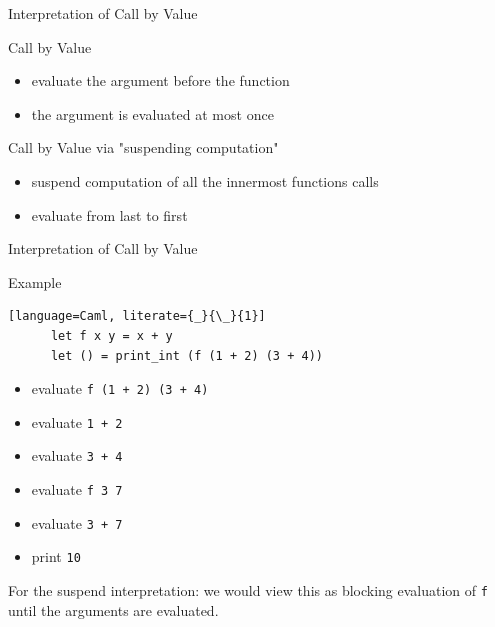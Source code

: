 \documentclass[10pt]{beamer}
\begin{document}
\begin{frame}[fragile]{Interpretation of Call by Value}
  \begin{alertblock}{Call by Value}
    \begin{itemize}
      \item evaluate the argument before the function
      \item the argument is evaluated at most once
    \end{itemize}
  \end{alertblock}

  \pause

  \begin{alertblock}{Call by Value via "suspending computation"}
    \begin{itemize}
      \item suspend computation of all the innermost functions calls
      \item evaluate from last to first
    \end{itemize}
  \end{alertblock}

\end{frame}

  \begin{frame}[fragile]{Interpretation of Call by Value}

  \begin{alertblock}{Example}
    \begin{lstlisting}[language=Caml, literate={_}{\_}{1}]
      let f x y = x + y
      let () = print_int (f (1 + 2) (3 + 4))

    \end{lstlisting}

    \pause

    \begin{itemize} [<+- | alert@+>]
      \item evaluate \texttt{f (1 + 2) (3 + 4)}
      \item evaluate \texttt{1 + 2}
      \item evaluate \texttt{3 + 4}
      \item evaluate \texttt{f 3 7}
      \item evaluate \texttt{3 + 7}
      \item print \texttt{10}
    \end{itemize}

    \pause

    For the suspend interpretation: we would view this as blocking evaluation of \texttt{f} until the arguments are evaluated.
  \end{alertblock}
\end{frame}
\end{document}
